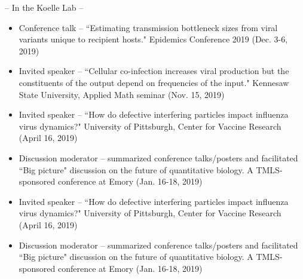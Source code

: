 \documentclass[a4paper,10pt]{article}
\newlength{\cvcolumngapwidth}
\newlength{\cvleftcolumnwidth}
\newlength{\cvrightcolumnwidth}
\newcommand{\cvdurationstyle}[1]{{\small\cvdurationfont\textcolor{cvdurationcolor}{#1}}}
\newlength{\cvafteritemskipamount}
\newlength{\cvparskip}
\newcommand{\cvitem}[2]{
            \begin{minipage}[t]{\cvleftcolumnwidth}
                \raggedleft #1
            \end{minipage}%
            \hspace{\cvcolumngapwidth}%
            \begin{minipage}[t]{\cvrightcolumnwidth}
                \setlength{\parskip}{\cvparskip} #2
            \end{minipage}
        
            \vspace{\cvafteritemskipamount}
        }
\begin{document}
        \cvitem{
            \cvdurationstyle{}
        }{	
        	    	-- In the Koelle Lab --
        	        \begin{itemize}[leftmargin=*] 
        
            	\item Conference talk -- ``Estimating transmission bottleneck sizes from viral variants unique to recipient hosts." Epidemics Conference 2019 (Dec. 3-6, 2019)
                \item Invited speaker -- ``Cellular co-infection increases viral production but the constituents of the output depend on frequencies of the input." Kennesaw State University, Applied 	Math seminar (Nov. 15, 2019)
                \item Invited speaker -- ``How do defective interfering particles impact influenza virus dynamics?" University of Pittsburgh, Center for Vaccine Research (April 16, 2019)
                \item Discussion moderator -- summarized conference talks/posters and facilitated ``Big picture" discussion on the future of quantitative biology. A TMLS-sponsored conference at Emory (Jan. 16-18, 2019) 
                               	\item Invited speaker -- ``How do defective interfering particles impact influenza virus dynamics?" University of Pittsburgh, Center for Vaccine Research (April 16, 2019)
	                \item Discussion moderator -- summarized conference talks/posters and facilitated ``Big picture" discussion on the future of quantitative biology. A TMLS-sponsored conference at Emory (Jan. 16-18, 2019) 
                \end{itemize}
                }
                        
\end{document}
